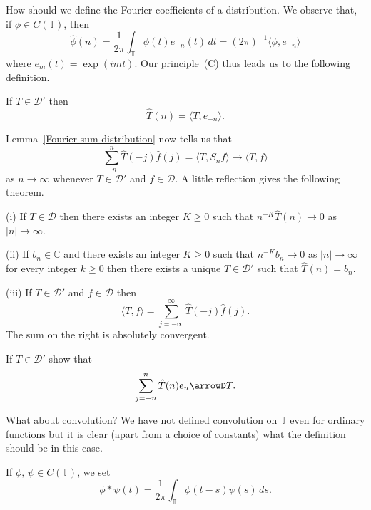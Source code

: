 How should we define the Fourier coefficients of a distribution.
We observe that, if $\phi\in C({\mathbb T})$, then
\[\hat{\phi}(n)=\frac{1}{2\pi}\int_{\mathbb T}\phi(t)e_{-n}(t)\,dt
=(2\pi)^{-1}\langle \phi,e_{-n}\rangle\]
where $e_{m}(t)=\exp(imt)$. Our principle~(C)
thus leads us to the following definition.
\begin{definition} If $T\in{\mathcal D}'$ then
\[\hat{T}(n)=\langle T,e_{-n}\rangle.\]
\end{definition}
Lemma~\ref{Fourier sum distribution} now tells us that
\[\sum_{-n}^{n}\hat{T}(-j)\hat{f}(j)
=\langle T,S_{n}f\rangle\rightarrow \langle T,f\rangle\]
as $n\rightarrow\infty$ whenever $T\in{\mathcal D}'$
and $f\in{\mathcal D}$. A little reflection gives
the following theorem.
\begin{theorem}\label{Distribution is series}
(i) If $T\in{\mathcal D}$ then there exists an integer $K\geq 0$
such that
$n^{-K}\hat{T}(n)\rightarrow 0$
as $|n|\rightarrow\infty$.

(ii) If $b_{n}\in{\mathbb C}$ and there exists an integer $K\geq 0$
such that $n^{-K}b_{n}\rightarrow 0$
as $|n|\rightarrow\infty$ for every integer $k\geq 0$
then there exists a unique $T\in{\mathcal D}'$ such that
$\hat{T}(n)=b_{n}$.

(iii) If $T\in{\mathcal D}'$
and $f\in{\mathcal D}$ then
\[\langle T,f\rangle=\sum_{j=-\infty}^{\infty}\hat{T}(-j)\hat{f}(j).\]
The sum on the right is absolutely convergent.
\end{theorem}
\begin{exercise} If $T\in{\mathcal D}'$ show that
\[\sum_{j=-n}^{n}\hat{T}(n)e_{n}\arrowD T.\]
\end{exercise}

What about convolution? We have not defined convolution
on ${\mathbb T}$ even for ordinary functions but it
is clear (apart from a choice of constants) what the
definition should be in this case.
\begin{definition} If $\phi,\,\psi\in C({\mathbb T})$,
we set
\[\phi*\psi(t)=\frac{1}{2\pi}\int_{\mathbb T}\phi(t-s)\psi(s)\,ds.\]
\end{definition}

